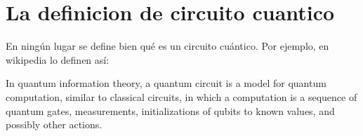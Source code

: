 \documentclass[10pt,letterpaper]{article} %
\begin{document}
\section{La definicion de circuito cuantico}

En ningún lugar se define bien qué es un circuito cuántico. Por ejemplo, en wikipedia lo definen así:

In quantum information theory, a quantum circuit is a model for quantum computation, similar to classical circuits, in which a computation is a sequence of quantum gates, measurements, initializations of qubits to known values, and possibly other actions.
\end{document}
